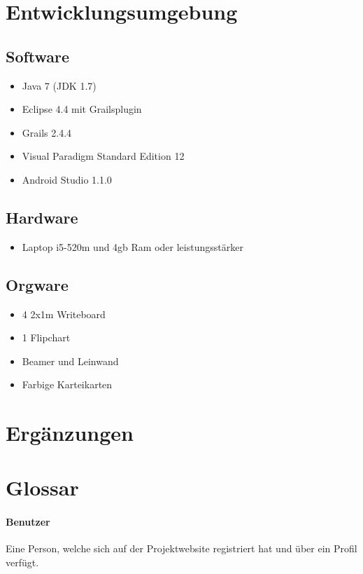 \documentclass[10pt,a4paper]{article}
\begin{document}
\section{Entwicklungsumgebung}
\subsection{Software}
\begin{itemize}
	\item Java 7 (JDK 1.7)
	\item Eclipse 4.4 mit Grailsplugin
	\item Grails 2.4.4
	\item Visual Paradigm Standard Edition 12
	\item Android Studio 1.1.0
\end{itemize}
\subsection{Hardware}
\begin{itemize}
	\item Laptop i5-520m und 4gb Ram oder leistungsst\"arker
\end{itemize}
\subsection{Orgware}
\begin{itemize}
	\item 4 2x1m Writeboard
	\item 1 Flipchart
	\item Beamer und Leinwand
	\item Farbige Karteikarten
\end{itemize}
\section{Erg\"anzungen}

\section{Glossar}

\paragraph{Benutzer} Eine Person, welche sich auf der Projektwebsite registriert hat und über ein Profil verfügt.
\end{document}
